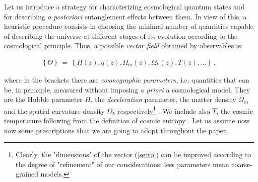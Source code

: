 \documentclass[nofootinbib,prd,superscriptaddress,showpacs,showkeys,]{revtex4}
\begin{document}
Let us  introduce a strategy for characterizing cosmological quantum states and for describing \emph{a posteriori}  entanglement effects between them.  In view of this, a heuristic procedure consists in  choosing the minimal number of quantities capable of describing the universe at different stages of its evolution according to  the cosmological principle. Thus, a possible
\textit{vector field} obtained by observables is:
\begin{widetext}
\begin{eqnarray}\label{setto}
\boxed{\left\{\Theta\right\}\,=\,\left\{H(z), q(z), \Omega_{m}(z), \Omega_{k}(z), T(z), \ldots\right\}\,,}
\end{eqnarray}
\end{widetext}
where  in the  brackets there are  \emph{cosmographic parameters}, i.e. quantities that can be, in principle, measured without imposing   \emph{a priori}  a cosmological model\cite{cosmografia}. They are the Hubble parameter $H$, the {\it deceleration} parameter, the matter density $\Omega_{m}$  and  the spatial curvature density  $\Omega_{k}$ respectively\footnote{Clearly, the "dimensions" of the vector (\ref{setto}) can be improved according to the degree of "refinement" of our considerations: less parameters mean coarse-grained models.} \cite{cosmografia2}. We include also $T$,  the cosmic  temperature  following from the definition of cosmic  entropy \cite{entropiaetemperatura}.
 Let us assume now now some prescriptions  that we are going to adopt throughout the paper.
\end{document}
